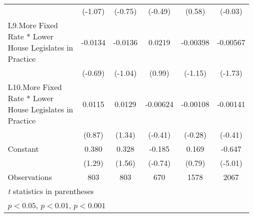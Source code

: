{\begin{longtable}{l*{5}{c}}
                &  (-1.07)         &  (-0.75)         &  (-0.49)         &   (0.58)         &  (-0.03)         \\
[1em]
L9.More Fixed Rate * Lower House Legislates in Practice&  -0.0134         &  -0.0136         &   0.0219         & -0.00398         & -0.00567         \\
                &  (-0.69)         &  (-1.04)         &   (0.99)         &  (-1.15)         &  (-1.73)         \\
[1em]
L10.More Fixed Rate * Lower House Legislates in Practice&   0.0115         &   0.0129         & -0.00624         & -0.00108         & -0.00141         \\
                &   (0.87)         &   (1.34)         &  (-0.41)         &  (-0.28)         &  (-0.41)         \\
[1em]
Constant        &    0.380         &    0.328         &   -0.185         &    0.169         &   -0.647\sym{***}\\
                &   (1.29)         &   (1.56)         &  (-0.74)         &   (0.79)         &  (-5.01)         \\
\hline
Observations    &      803         &      803         &      670         &     1578         &     2067         \\
\hline\hline
\multicolumn{6}{l}{\footnotesize \textit{t} statistics in parentheses}\\
\multicolumn{6}{l}{\footnotesize \sym{*} \(p<0.05\), \sym{**} \(p<0.01\), \sym{***} \(p<0.001\)}\\
\end{longtable}
}

